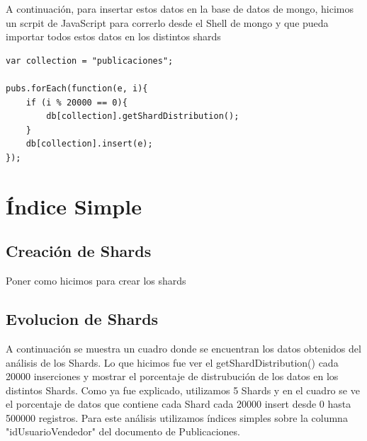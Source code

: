 \documentclass[a4paper, 10pt, twoside]{article}
\begin{document}
A continuaci\'on, para insertar estos datos en la base de datos de mongo, hicimos un scrpit de JavaScript para correrlo desde el Shell de mongo y que pueda importar todos estos datos en los distintos shards




\begin{lstlisting}[caption=Ejercicio 6]
var collection = "publicaciones";

pubs.forEach(function(e, i){
    if (i % 20000 == 0){
        db[collection].getShardDistribution();
    }
    db[collection].insert(e);
});
\end{lstlisting}


\section{\'Indice Simple}

\subsection{Creaci\'on de Shards}

Poner como hicimos para crear los shards

\subsection{Evolucion de Shards}

A continuaci\'on se muestra un cuadro donde se encuentran los datos obtenidos del an\'alisis de los Shards. Lo que hicimos fue ver el getShardDistribution() cada 20000 inserciones y mostrar el porcentaje de distrubuci\'on de los datos en los distintos Shards.
Como ya fue explicado, utilizamos 5 Shards y en el cuadro se ve el porcentaje de datos que contiene cada Shard cada 20000 insert desde 0 hasta 500000 registros.
Para este an\'alisis utilizamos \'indices simples sobre la columna "idUsuarioVendedor" del documento de Publicaciones.
\end{document}
